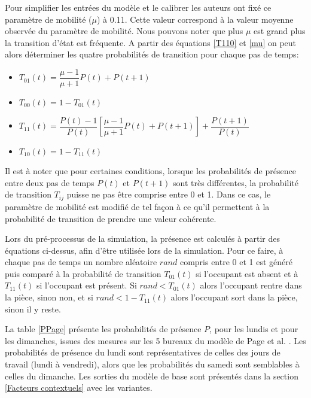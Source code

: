 Pour simplifier les entrées du modèle et le calibrer les auteurs ont fixé ce paramètre de mobilité ($\mu$) à 0.11. Cette valeur correspond à la valeur moyenne observée du paramètre de mobilité. Nous pouvons noter que plus $\mu$ est grand plus la transition d'état est fréquente.
A partir des équations \eqref{T110} et \eqref{mu} on peut alors déterminer les quatre probabilités de transition pour chaque pas de temps:

\begin{itemize}
\item $T_{01}(t)=\dfrac{\mu-1}{\mu+1}P(t)+P(t+1)$
\item $T_{00}(t)=1-T_{01}(t)$
\item $T_{11}(t)=\dfrac{P(t)-1}{P(t)}\left[\dfrac{\mu-1}{\mu+1}P(t)+P(t+1)\right]+\dfrac{P(t+1)}{P(t)}$
\item $T_{10}(t)=1-T_{11}(t)$
\end{itemize}

Il est à noter que pour certaines conditions, lorsque les probabilités de présence entre deux pas de temps $P(t)$ et $P(t+1)$ sont très différentes, la probabilité de transition $T_{ij}$ puisse ne pas être comprise entre 0 et 1. Dans ce cas, le paramètre de mobilité est modifié de tel façon à ce qu'il permettent à la probabilité de transition de prendre une valeur cohérente.

Lors du pré-processus de la simulation, la présence est calculés à partir des équations ci-dessus, afin d'être utilisée lors de la simulation. Pour ce faire, à chaque pas de temps un nombre aléatoire $rand$ compris entre 0 et 1 est généré puis comparé à la probabilité de transition $T_{01}(t)$ si l'occupant est absent et à $T_{11}(t)$ si l'occupant est présent. Si $rand < T_{01}(t)$ alors l'occupant rentre dans la pièce, sinon non, et si $rand < 1-T_{11}(t)$ alors l'occupant sort dans la pièce, sinon il y reste.

La table \ref{PPage} présente les probabilités de présence $P$, pour les lundis et pour les dimanches, issues des mesures sur les 5 bureaux du modèle de Page et al. \cite{Page-08}. Les probabilités de présence du lundi sont représentatives de celles des jours de travail (lundi à vendredi), alors que les probabilités du samedi sont semblables à celles du dimanche. Les sorties du modèle de base sont présentés dans la section \ref{Facteurs contextuels} avec les variantes.

